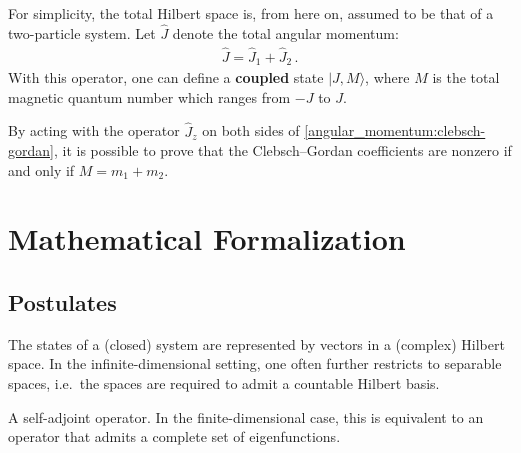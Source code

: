     For simplicity, the total Hilbert space is, from here on, assumed to be that of a two-particle system. Let $\widehat{J}$ denote the total angular momentum:
    \begin{gather}
        \widehat{J} = \widehat{J}_1 + \widehat{J}_2\,.
    \end{gather}
    With this operator, one can define a \textbf{coupled} state $|J,M\rangle$, where $M$ is the total magnetic quantum number which ranges from $-J$ to $J$.


    \begin{property}
        By acting with the operator $\widehat{J}_z$ on both sides of \cref{angular_momentum:clebsch-gordan}, it is possible to prove that the Clebsch--Gordan coefficients are nonzero if and only if $M = m_1 + m_2$.
    \end{property}

\section{Mathematical Formalization}\label{section:mathematical_formalism_qm}
\subsection{Postulates}

    \begin{axiom}
        The states of a (closed) system are represented by vectors in a (complex) Hilbert space. In the infinite-dimensional setting, one often further restricts to separable spaces, i.e.~the spaces are required to admit a countable Hilbert basis.
    \end{axiom}

    \begin{axiom}[Observables]
        A self-adjoint operator. In the finite-dimensional case, this is equivalent to an operator that admits a complete set of eigenfunctions.
    \end{axiom}

